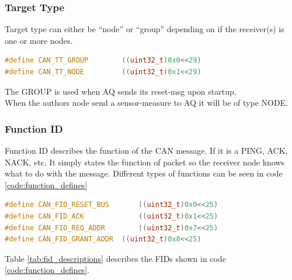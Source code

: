 \subsubsection{Target Type}
Target type can either be “node” or “group” depending on if the receiver(s) is one or more nodes. 
\begin{lstlisting}[language = c, caption = Target type defined in AQ, label=code:target_types]
#define CAN_TT_GROUP        ((uint32_t)0x0<<29)
#define CAN_TT_NODE         ((uint32_t)0x1<<29)
\end{lstlisting}
The GROUP is used when AQ sends its reset-msg upon startup.\\
When the authors node send a sensor-measure to AQ it will be of type NODE.
\subsubsection{Function ID}

Function ID describes the function of the CAN message. If it is a PING, ACK, NACK, etc.
It simply states the function of packet so the receiver node knows what to do with the message.
Different types of functions can be seen in code \ref{code:function_defines}
\begin{lstlisting}[language = c, caption = Excerpts from AQ's list of function defines, label=code:function_defines]
#define CAN_FID_RESET_BUS		((uint32_t)0x0<<25)
#define CAN_FID_ACK				((uint32_t)0x1<<25)
#define CAN_FID_REQ_ADDR		((uint32_t)0x7<<25)
#define CAN_FID_GRANT_ADDR	((uint32_t)0x8<<25)
\end{lstlisting}

Table \ref{tab:fid_descriptions} describes the FIDs shown in code \ref{code:function_defines}.
\begin{table}[H]
\centering
\caption{Descriptions of the FIDs mentioned in code \ref{code:function_defines}}
\label{tab:fid_descriptions}
\end{table}

